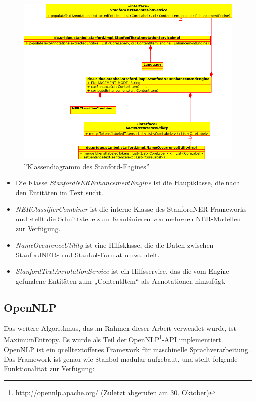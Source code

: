 \begin{figure}[ht]
\centering
\includegraphics[width=\textwidth]{Bilder/stanford-classes.png}
\caption{''Klassendiagramm  des Stanford-Engines''}
\label{fig:stanfclasses}
\end{figure}
\begin{itemize}
\item Die Klasse \textit{StanfordNEREnhancementEngine} ist die Hauptklasse, die nach den Entitäten im Text sucht.
\item \textit{NERClassifierCombiner} ist die interne Klasse des StanfordNER-Frameworks und stellt die Schnittstelle zum Kombinieren von mehreren NER-Modellen zur Verfügung.
\item \textit{NameOccurenceUtility} ist eine Hilfsklasse, die die Daten zwischen StanfordNER- und Stanbol-Format umwandelt.
\item \textit{StanfordTextAnnotationService} ist ein Hilfsservice, das die vom Engine gefundene Entitäten zum ,,ContentItem`` als Annotationen hinzufügt.
\end{itemize}

\subsection{OpenNLP}
Das weitere Algorithmus, das im Rahmen dieser Arbeit verwendet wurde, ist MaximumEntropy. Es wurde als Teil der OpenNLP\footnote{\url{http://opennlp.apache.org/} (Zuletzt abgerufen am 30. Oktober)}-API implementiert. OpenNLP ist ein quelltextoffenes Framework für maschinelle Sprachverarbeitung. Das Framework ist genau wie Stanbol modular aufgebaut, und stellt folgende Funktionalität zur Verfügung:

